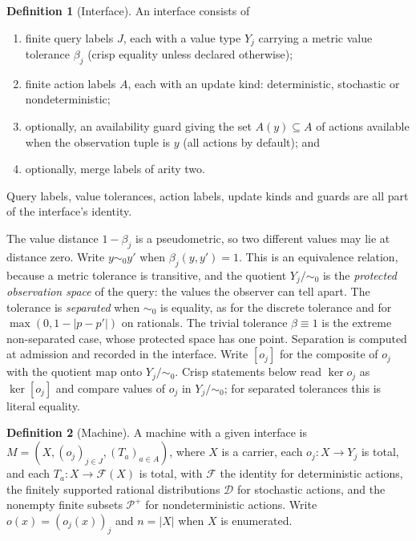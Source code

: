 \documentclass[11pt]{article}
\theoremstyle{definition}
\newtheorem{definition}{Definition}[section]
\theoremstyle{plain}
\begin{document}
\begin{definition}[Interface]\label{def:interface}
An interface consists of
\begin{enumerate}
\item finite query labels $J$, each with a value type $Y_j$ carrying a metric value tolerance
$\beta_j$ (crisp equality unless declared otherwise);
\item finite action labels $A$, each with an update kind: deterministic, stochastic or
nondeterministic;
\item optionally, an availability guard giving the set $A(y)\subseteq A$ of actions available
when the observation tuple is $y$ (all actions by default); and
\item optionally, merge labels of arity two.
\end{enumerate}
Query labels, value tolerances, action labels, update kinds and guards are all part of the
interface's identity.
\end{definition}

The value distance $1-\beta_j$ is a pseudometric, so two different values may lie at distance
zero. Write $y\sim_0y'$ when $\beta_j(y,y')=1$. This is an equivalence relation, because a metric
tolerance is transitive, and the quotient $Y_j/{\sim_0}$ is the \emph{protected observation
space} of the query: the values the observer can tell apart. The tolerance is \emph{separated}
when $\sim_0$ is equality, as for the discrete tolerance and for $\max(0,1-|p-p'|)$ on rationals. The
trivial tolerance $\beta\equiv1$ is the extreme non-separated case, whose protected space has one
point. Separation is computed at admission and recorded in the interface. Write $[o_j]$ for the
composite of $o_j$ with the quotient map onto $Y_j/{\sim_0}$. Crisp statements below read
$\ker o_j$ as $\ker[o_j]$ and compare values of $o_j$ in $Y_j/{\sim_0}$; for separated tolerances
this is literal equality.

\begin{definition}[Machine]\label{def:machine}
A machine with a given interface is $M=(X,(o_j)_{j\in J},(T_a)_{a\in A})$, where $X$ is a
carrier, each $o_j:X\to Y_j$ is total, and each $T_a:X\to\mathcal F(X)$ is total, with
$\mathcal F$ the identity for deterministic actions, the finitely supported rational
distributions $\mathcal D$ for stochastic actions, and the nonempty finite subsets
$\mathcal P^{+}$ for nondeterministic actions. Write $o(x)=(o_j(x))_j$ and $n=|X|$ when $X$ is
enumerated.
\end{definition}
\end{document}
